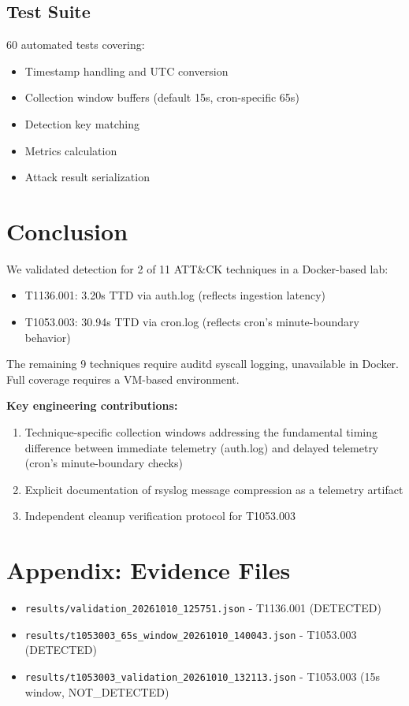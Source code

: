 \documentclass[11pt,a4paper]{article}
\begin{document}
\subsection{Test Suite}

60 automated tests covering:
\begin{itemize}
    \item Timestamp handling and UTC conversion
    \item Collection window buffers (default 15s, cron-specific 65s)
    \item Detection key matching
    \item Metrics calculation
    \item Attack result serialization
\end{itemize}

\section{Conclusion}

We validated detection for 2 of 11 ATT\&CK techniques in a Docker-based lab:
\begin{itemize}
    \item T1136.001: 3.20s TTD via auth.log (reflects ingestion latency)
    \item T1053.003: 30.94s TTD via cron.log (reflects cron's minute-boundary behavior)
\end{itemize}

The remaining 9 techniques require auditd syscall logging, unavailable in Docker. Full coverage requires a VM-based environment.

\textbf{Key engineering contributions:}
\begin{enumerate}
    \item Technique-specific collection windows addressing the fundamental timing difference between immediate telemetry (auth.log) and delayed telemetry (cron's minute-boundary checks)
    \item Explicit documentation of rsyslog message compression as a telemetry artifact
    \item Independent cleanup verification protocol for T1053.003
\end{enumerate}

\section*{Appendix: Evidence Files}

\begin{itemize}
    \item \texttt{results/validation\_20261010\_125751.json} - T1136.001 (DETECTED)
    \item \texttt{results/t1053003\_65s\_window\_20261010\_140043.json} - T1053.003 (DETECTED)
    \item \texttt{results/t1053003\_validation\_20261010\_132113.json} - T1053.003 (15s window, NOT\_DETECTED)
\end{itemize}
\end{document}
